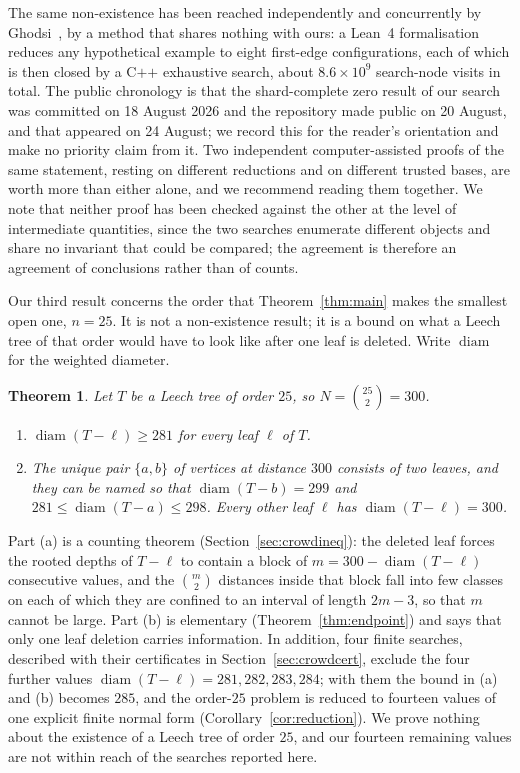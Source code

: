 \documentclass[11pt,a4paper]{article}
\theoremstyle{plain}
\newtheorem{theorem}{Theorem}[section]
\theoremstyle{remark}
\newcommand{\bin}[2]{\binom{#1}{#2}}
\newcommand{\diam}{\operatorname{diam}}
\begin{document}
The same non-existence has been reached independently and concurrently by
Ghodsi~\cite{Ghodsi2026}, by a method that shares nothing with ours: a Lean~4
formalisation reduces any hypothetical example to eight first-edge
configurations, each of which is then closed by a $\mathrm{C}\texttt{++}$
exhaustive search, about $8.6\times10^9$ search-node visits in total.  The
public chronology is that the shard-complete zero result of our search was
committed on 18 August 2026 and the repository made public on 20 August, and
that \cite{Ghodsi2026} appeared on 24 August; we record this for the reader's
orientation and make no priority claim from it.  Two independent
computer-assisted proofs of the same statement, resting on different reductions
and on different trusted bases, are worth more than either alone, and we
recommend reading them together.  We note that neither proof has been checked
against the other at the level of intermediate quantities, since the two
searches enumerate different objects and share no invariant that could be
compared; the agreement is therefore an agreement of conclusions rather than of
counts.

Our third result concerns the order that Theorem~\ref{thm:main} makes the
smallest open one, $n=25$.  It is not a non-existence result; it is a bound on
what a Leech tree of that order would have to look like after one leaf is
deleted.  Write $\diam$ for the weighted diameter.

\begin{theorem}\label{thm:crowd}
Let $T$ be a Leech tree of order $25$, so $N=\bin{25}2=300$.
\begin{enumerate}
\item[(a)] $\diam(T-\ell)\ge 281$ for every leaf $\ell$ of $T$.
\item[(b)] The unique pair $\{a,b\}$ of vertices at distance $300$ consists of
two leaves, and they can be named so that $\diam(T-b)=299$ and
$281\le\diam(T-a)\le 298$.  Every other leaf $\ell$ has $\diam(T-\ell)=300$.
\end{enumerate}
\end{theorem}

Part (a) is a counting theorem (Section~\ref{sec:crowdineq}): the deleted leaf
forces the rooted depths of $T-\ell$ to contain a block of $m=300-\diam(T-\ell)$
consecutive values, and the $\bin m2$ distances inside that block fall into few
classes on each of which they are confined to an interval of length $2m-3$, so
that $m$ cannot be large.  Part (b) is elementary
(Theorem~\ref{thm:endpoint}) and says that only one leaf deletion carries
information.  In addition, four finite searches, described with their
certificates in Section~\ref{sec:crowdcert}, exclude the four further values
$\diam(T-\ell)=281,282,283,284$; with them the bound in (a) and (b) becomes
$285$, and the order-$25$ problem is reduced to fourteen values of one explicit
finite normal form (Corollary~\ref{cor:reduction}).  We prove nothing about the
existence of a Leech tree of order $25$, and our fourteen remaining values are
not within reach of the searches reported here.
\end{document}

